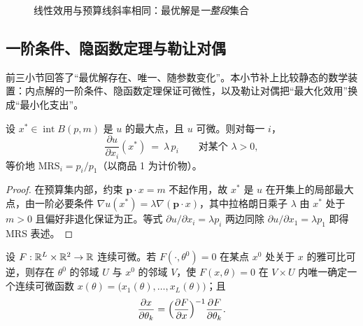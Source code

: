 \begin{figure}[H]
\centering
{}
\caption{线性效用与预算线斜率相同：最优解是\emph{一整段}集合}
\end{figure}

\subsection{一阶条件、隐函数定理与勒让对偶}

前三小节回答了“最优解存在、唯一、随参数变化”。本小节补上比较静态的数学装置：内点解的一阶条件、隐函数定理保证可微性，以及勒让对偶把“最大化效用”换成“最小化支出”。

\begin{lemma}[内点解的一阶条件]\label{lem:foc}
设 $x^{*}\in\operatorname{int}B(p,m)$ 是 $u$ 的最大点，且 $u$ 可微。则对每一 $i$，
\[
\frac{\partial u}{\partial x_{i}}(x^{*})\ =\ \lambda\,p_{i}\qquad\text{对某个 }\lambda>0,
\]
等价地 $\mathrm{MRS}_{i}=p_{i}/p_{1}$（以商品 1 为计价物）。
\end{lemma}

\begin{proof}
在预算集内部，约束 $\boldsymbol{p}\cdot x=m$ 不起作用，故 $x^{*}$ 是 $u$ 在开集上的局部最大点，由一阶必要条件 $\nabla u(x^{*})=\lambda\nabla(\boldsymbol{p}\cdot x)$，其中拉格朗日乘子 $\lambda$ 由 $x^{*}$ 处于 $m>0$ 且偏好非退化保证为正。等式 $\partial u/\partial x_{i}=\lambda p_{i}$ 两边同除 $\partial u/\partial x_{1}=\lambda p_{1}$ 即得 MRS 表述。
\end{proof}

\begin{theorem}
设 $F:\mathbb{R}^{L}\times\mathbb{R}^{2}\to\mathbb{R}$ 连续可微。若 $F(\cdot,\theta^{0})=0$ 在某点 $x^{0}$ 处关于 $x$ 的雅可比可逆，则存在 $\theta^{0}$ 的邻域 $U$ 与 $x^{0}$ 的邻域 $V$，使 $F(x,\theta)=0$ 在 $V\times U$ 内唯一确定一个连续可微函数 $x(\theta)=\bigl(x_{1}(\theta),\dots,x_{L}(\theta)\bigr)$；且
\[
\frac{\partial x}{\partial\theta_{k}}
=\Bigl(\frac{\partial F}{\partial x}\Bigr)^{-1}\frac{\partial F}{\partial\theta_{k}} .
\]
\end{theorem}

